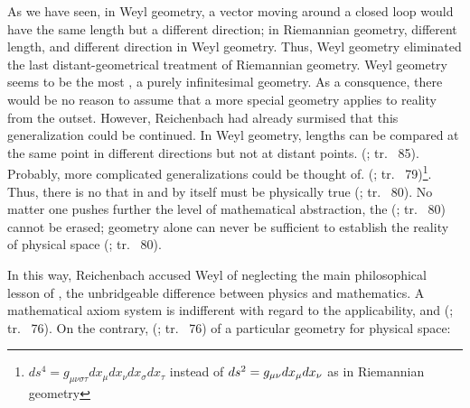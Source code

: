 \documentclass[draft]{article}
\newcommand{\WG}{Weyl geometry\xspace}
\newcommand{\rhp}[2]{(\cite[#1]{Reichenbach1920a}; tr.\ \citeyear{Reichenbach1969} #2)\xspace}
\begin{document}
As we have seen, in \WG, a vector moving around a closed loop would have the same length but a different direction; in Riemannian geometry, different length, and different direction in \WG. Thus, \WG eliminated the last distant-geometrical treatment of Riemannian geometry. \WG seems to be the most , a purely infinitesimal geometry. As a consquence, there would be no reason to assume that a more special geometry applies to reality from the outset. However, Reichenbach had already surmised that this generalization could be continued. In \WG, lengths can be compared at the same point in different directions but not at distant points.  \rhp{76}{85}. Probably, more complicated generalizations could be thought of.  \rhp{76}{79}\footnote{$d s^{4}=g_{\mu \nu \sigma \tau} d x_{\mu} d x_{\nu} d x_{\sigma} d x_{\tau}$ instead of $d s^{2}=g_{\mu\nu} d x_{\mu} d x_{\nu}$ as in Riemannian geometry}. Thus, there is no  that in and by itself must be physically true \rhp{76}{80}. No matter one pushes further the level of mathematical abstraction, the  \rhp{76}{80} cannot be erased; geometry alone can never be sufficient to establish the reality of physical space \rhp{76}{80}. 

In this way, Reichenbach accused Weyl of neglecting the main philosophical lesson of \gr, the unbridgeable difference between physics and mathematics. A mathematical axiom system is indifferent with regard to the applicability, and  \rhp{73}{76}. On the contrary,  \rhp{73}{76} of a particular geometry for physical space:
\end{document}
